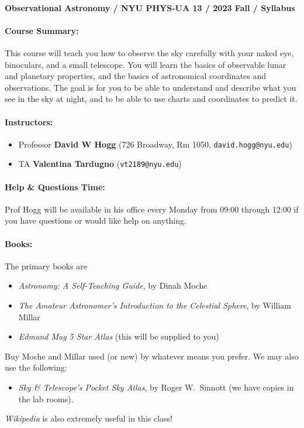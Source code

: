 \paragraph{Observational Astronomy / NYU PHYS-UA 13 / 2023 Fall / Syllabus}

\paragraph{Course Summary:} This course will teach you how to
observe the sky carefully with your naked eye, binoculars, and a small
telescope. You will learn the basics of observable lunar and planetary
properties, and the basics of astronomical coordinates and
observations. The goal is for you to be able to understand and
describe what you see in the sky at night, and to be able to use
charts and coordinates to predict it.

\paragraph{Instructors:}
\begin{itemize}
\item Professor {\bf David W Hogg} (726 Broadway, Rm 1050, {\tt david.hogg@nyu.edu})
\item TA {\bf Valentina Tardugno} ({\tt vt2189@nyu.edu})
\end{itemize}

\paragraph{Help \& Questions Time:} Prof Hogg will be available in
  his office every Monday from 09:00 through 12:00 if you
  have questions or would like help on anything.

\paragraph{Books:} The primary books are
\begin{itemize}
\item {\it Astronomy: A Self-Teaching Guide}, by Dinah Moche
\item {\it The Amateur Astronomer's Introduction to the Celestial
  Sphere}, by William Millar
\item {\it Edmund Mag 5 Star Atlas} (this will be supplied to you)
\end{itemize}
Buy Moche and Millar used (or new) by whatever means you prefer.
We may also use the following:
\begin{itemize}
\item {\it Sky \& Telescope's Pocket Sky Atlas}, by Roger W.~Sinnott
(we have copies in the lab rooms).
\end{itemize}
{\it Wikipedia} is also extremely useful in this class!

